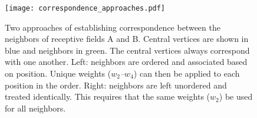 \begin{figure}
	\centering
	\texttt{[image: correspondence\_approaches.pdf]}
	\caption{Two approaches of establishing correspondence between the neighbors of receptive fields A and B. Central vertices are shown in blue and neighbors in green. The central vertices always correspond with one another. Left: neighbors are ordered and associated based on position. Unique weights (\textit{$w_2$--$w_4$}) can then be applied to each position in the order. Right: neighbors are left unordered and treated identically. This requires that the same weights (\textit{$w_2$}) be used for all neighbors.}
	\label{fig:correspondence_approaches}
\end{figure}


